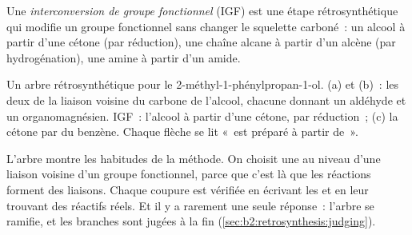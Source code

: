 \begin{definition}\label{def:b2:retrosynthesis:fgi}
Une \emph{interconversion de groupe fonctionnel} (IGF)
est une étape rétrosynthétique qui modifie un groupe fonctionnel sans changer le squelette carboné~: un
alcool à partir d'une cétone (par réduction), une chaîne alcane à partir d'un alcène (par
hydrogénation), une amine à partir d'un amide.
\end{definition}

\begin{omfigure}
\par\vspace{6pt}

{\small Un arbre rétrosynthétique pour le 2-méthyl-1-phénylpropan-1-ol. (a) et (b)~: les deux
 de la liaison  voisine du carbone de l'alcool, chacune donnant un aldéhyde et un
organomagnésien. IGF~: l'alcool à partir d'une cétone, par réduction~; (c) la cétone par  du benzène. Chaque flèche se lit «~est préparé à partir de~».}
\end{omfigure}

L'arbre montre les habitudes de la méthode. On choisit une  au niveau d'une liaison voisine
d'un groupe fonctionnel, parce que c'est là que les réactions forment des liaisons. Chaque coupure est
vérifiée en écrivant les  et en leur trouvant des réactifs réels. Et il y a rarement une seule
réponse~: l'arbre se ramifie, et les branches sont jugées à la fin (\cref{sec:b2:retrosynthesis:judging}).

